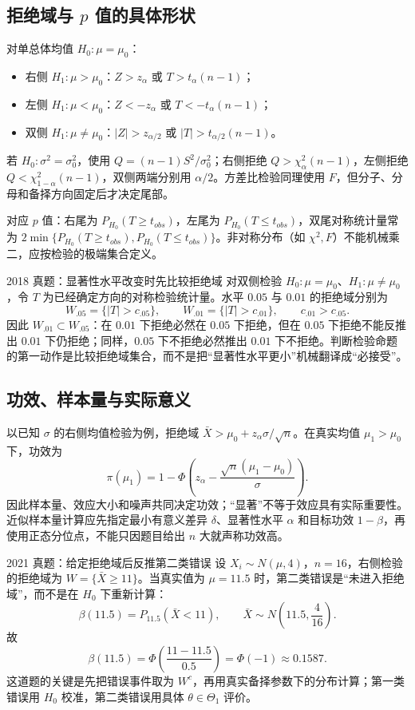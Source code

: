 \documentclass[11pt,a4paper]{ctexart}
\begin{document}
\subsection{拒绝域与 $p$ 值的具体形状}

对单总体均值 $H_0:\mu=\mu_0$：
\begin{itemize}
  \item 右侧 $H_1:\mu>\mu_0$：$Z>z_\alpha$ 或 $T>t_\alpha(n-1)$；
  \item 左侧 $H_1:\mu<\mu_0$：$Z<-z_\alpha$ 或 $T<-t_\alpha(n-1)$；
  \item 双侧 $H_1:\mu\ne\mu_0$：$|Z|>z_{\alpha/2}$ 或 $|T|>t_{\alpha/2}(n-1)$。
\end{itemize}
若 $H_0:\sigma^2=\sigma_0^2$，使用 $Q=(n-1)S^2/\sigma_0^2$；右侧拒绝 $Q>\chi^2_\alpha(n-1)$，左侧拒绝 $Q<\chi^2_{1-\alpha}(n-1)$，双侧两端分别用 $\alpha/2$。方差比检验同理使用 $F$，但分子、分母和备择方向固定后才决定尾部。

对应 $p$ 值：右尾为 $P_{H_0}(T\ge t_{obs})$，左尾为 $P_{H_0}(T\le t_{obs})$，双尾对称统计量常为 $2\min\{P_{H_0}(T\ge t_{obs}),P_{H_0}(T\le t_{obs})\}$。非对称分布（如 $\chi^2,F$）不能机械乘二，应按检验的极端集合定义。

\begin{examplebox}{2018 真题：显著性水平改变时先比较拒绝域}
对双侧检验 $H_0:\mu=\mu_0$、$H_1:\mu\ne\mu_0$，令 $T$ 为已经确定方向的对称检验统计量。水平 $0.05$ 与 $0.01$ 的拒绝域分别为
\[
W_{.05}=\{|T|>c_{.05}\},\qquad
W_{.01}=\{|T|>c_{.01}\},\qquad c_{.01}>c_{.05}.
\]
因此 $W_{.01}\subset W_{.05}$：在 $0.01$ 下拒绝必然在 $0.05$ 下拒绝，但在 $0.05$ 下拒绝不能反推出 $0.01$ 下仍拒绝；同样，$0.05$ 下不拒绝必然推出 $0.01$ 下不拒绝。判断检验命题的第一动作是比较拒绝域集合，而不是把“显著性水平更小”机械翻译成“必接受”。
\end{examplebox}

\subsection{功效、样本量与实际意义}

以已知 $\sigma$ 的右侧均值检验为例，拒绝域 $\bar X>\mu_0+z_\alpha\sigma/\sqrt n$。在真实均值 $\mu_1>\mu_0$ 下，功效为
\[
\pi(\mu_1)=1-\Phi\left(z_\alpha-\frac{\sqrt n(\mu_1-\mu_0)}\sigma\right).
\]
因此样本量、效应大小和噪声共同决定功效；“显著”不等于效应具有实际重要性。近似样本量计算应先指定最小有意义差异 $\delta$、显著性水平 $\alpha$ 和目标功效 $1-\beta$，再使用正态分位点，不能只因题目给出 $n$ 大就声称功效高。

\begin{examplebox}{2021 真题：给定拒绝域后反推第二类错误}
设 $X_i\sim N(\mu,4)$，$n=16$，右侧检验的拒绝域为 $W=\{\bar X\ge 11\}$。当真实值为 $\mu=11.5$ 时，第二类错误是“未进入拒绝域”，而不是在 $H_0$ 下重新计算：
\[
\beta(11.5)=P_{11.5}(\bar X<11),\qquad
\bar X\sim N\!\left(11.5,\frac4{16}\right).
\]
故
\[
\beta(11.5)=\Phi\!\left(\frac{11-11.5}{0.5}\right)=\Phi(-1)\approx0.1587.
\]
这道题的关键是先把错误事件取为 $W^c$，再用真实备择参数下的分布计算；第一类错误用 $H_0$ 校准，第二类错误用具体 $\theta\in\Theta_1$ 评价。
\end{examplebox}
\end{document}
